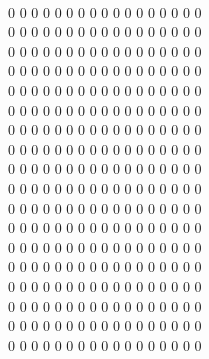 \documentclass{article}
\begin{document}
\vspace{5mm}
\hspace{2mm} \\
0 0 0 0 0 0 0 0 0 0 0 0 0 0 0 0 0 \\
0 0 0 0 0 0 0 0 0 0 0 0 0 0 0 0 0 \\
0 0 0 0 0 0 0 0 0 0 0 0 0 0 0 0 0 \\
0 0 0 0 0 0 0 0 0 0 0 0 0 0 0 0 0 \\
0 0 0 0 0 0 0 0 0 0 0 0 0 0 0 0 0 \\
0 0 0 0 0 0 0 0 0 0 0 0 0 0 0 0 0 \\
0 0 0 0 0 0 0 0 0 0 0 0 0 0 0 0 0 \\
0 0 0 0 0 0 0 0 0 0 0 0 0 0 0 0 0 \\
0 0 0 0 0 0 0 0 0 0 0 0 0 0 0 0 0 \\
0 0 0 0 0 0 0 0 0 0 0 0 0 0 0 0 0 \\
0 0 0 0 0 0 0 0 0 0 0 0 0 0 0 0 0 \\
0 0 0 0 0 0 0 0 0 0 0 0 0 0 0 0 0 \\
0 0 0 0 0 0 0 0 0 0 0 0 0 0 0 0 0 \\
0 0 0 0 0 0 0 0 0 0 0 0 0 0 0 0 0 \\
0 0 0 0 0 0 0 0 0 0 0 0 0 0 0 0 0 \\
0 0 0 0 0 0 0 0 0 0 0 0 0 0 0 0 0 \\
0 0 0 0 0 0 0 0 0 0 0 0 0 0 0 0 0 \\
0 0 0 0 0 0 0 0 0 0 0 0 0 0 0 0 0 \\
\end{document}
